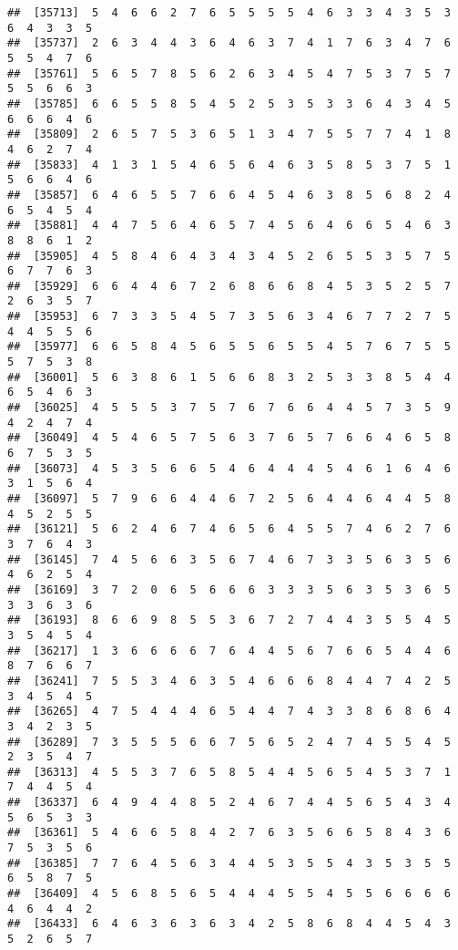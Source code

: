 \documentclass[
]{book}
\begin{document}
\begin{verbatim}
##  [35713]  5  4  6  6  2  7  6  5  5  5  5  4  6  3  3  4  3  5  3  6  4  3  3  5
##  [35737]  2  6  3  4  4  3  6  4  6  3  7  4  1  7  6  3  4  7  6  5  5  4  7  6
##  [35761]  5  6  5  7  8  5  6  2  6  3  4  5  4  7  5  3  7  5  7  5  5  6  6  3
##  [35785]  6  6  5  5  8  5  4  5  2  5  3  5  3  3  6  4  3  4  5  6  6  6  4  6
##  [35809]  2  6  5  7  5  3  6  5  1  3  4  7  5  5  7  7  4  1  8  4  6  2  7  4
##  [35833]  4  1  3  1  5  4  6  5  6  4  6  3  5  8  5  3  7  5  1  5  6  6  4  6
##  [35857]  6  4  6  5  5  7  6  6  4  5  4  6  3  8  5  6  8  2  4  6  5  4  5  4
##  [35881]  4  4  7  5  6  4  6  5  7  4  5  6  4  6  6  5  4  6  3  8  8  6  1  2
##  [35905]  4  5  8  4  6  4  3  4  3  4  5  2  6  5  5  3  5  7  5  6  7  7  6  3
##  [35929]  6  6  4  4  6  7  2  6  8  6  6  8  4  5  3  5  2  5  7  2  6  3  5  7
##  [35953]  6  7  3  3  5  4  5  7  3  5  6  3  4  6  7  7  2  7  5  4  4  5  5  6
##  [35977]  6  6  5  8  4  5  6  5  5  6  5  5  4  5  7  6  7  5  5  5  7  5  3  8
##  [36001]  5  6  3  8  6  1  5  6  6  8  3  2  5  3  3  8  5  4  4  6  5  4  6  3
##  [36025]  4  5  5  5  3  7  5  7  6  7  6  6  4  4  5  7  3  5  9  4  2  4  7  4
##  [36049]  4  5  4  6  5  7  5  6  3  7  6  5  7  6  6  4  6  5  8  6  7  5  3  5
##  [36073]  4  5  3  5  6  6  5  4  6  4  4  4  5  4  6  1  6  4  6  3  1  5  6  4
##  [36097]  5  7  9  6  6  4  4  6  7  2  5  6  4  4  6  4  4  5  8  4  5  2  5  5
##  [36121]  5  6  2  4  6  7  4  6  5  6  4  5  5  7  4  6  2  7  6  3  7  6  4  3
##  [36145]  7  4  5  6  6  3  5  6  7  4  6  7  3  3  5  6  3  5  6  4  6  2  5  4
##  [36169]  3  7  2  0  6  5  6  6  6  3  3  3  5  6  3  5  3  6  5  3  3  6  3  6
##  [36193]  8  6  6  9  8  5  5  3  6  7  2  7  4  4  3  5  5  4  5  3  5  4  5  4
##  [36217]  1  3  6  6  6  6  7  6  4  4  5  6  7  6  6  5  4  4  6  8  7  6  6  7
##  [36241]  7  5  5  3  4  6  3  5  4  6  6  6  8  4  4  7  4  2  5  3  4  5  4  5
##  [36265]  4  7  5  4  4  4  6  5  4  4  7  4  3  3  8  6  8  6  4  3  4  2  3  5
##  [36289]  7  3  5  5  5  6  6  7  5  6  5  2  4  7  4  5  5  4  5  2  3  5  4  7
##  [36313]  4  5  5  3  7  6  5  8  5  4  4  5  6  5  4  5  3  7  1  7  4  4  5  4
##  [36337]  6  4  9  4  4  8  5  2  4  6  7  4  4  5  6  5  4  3  4  5  6  5  3  3
##  [36361]  5  4  6  6  5  8  4  2  7  6  3  5  6  6  5  8  4  3  6  7  5  3  5  6
##  [36385]  7  7  6  4  5  6  3  4  4  5  3  5  5  4  3  5  3  5  5  6  5  8  7  5
##  [36409]  4  5  6  8  5  6  5  4  4  4  5  5  4  5  5  6  6  6  6  4  6  4  4  2
##  [36433]  6  4  6  3  6  3  6  3  4  2  5  8  6  8  4  4  5  4  3  5  2  6  5  7

\end{verbatim}
\end{document}
